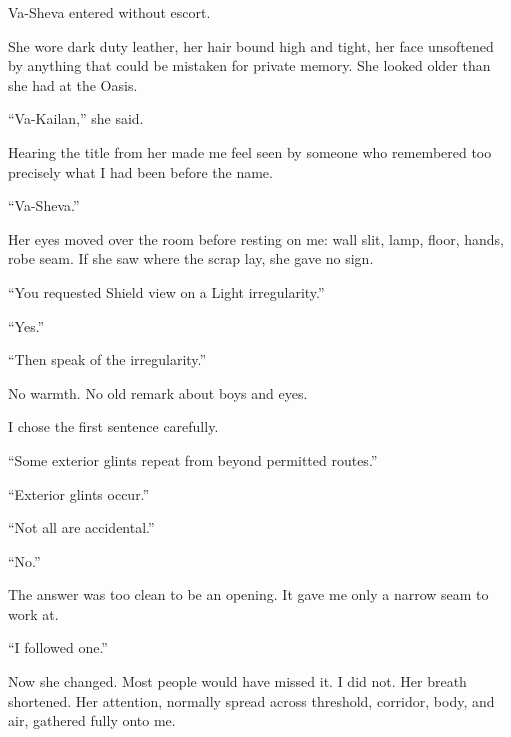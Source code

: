 Va-Sheva entered without escort.\par

She wore dark duty leather, her hair bound high and tight, her face unsoftened by anything that could be mistaken for private memory. She looked older than she had at the Oasis.\par

``Va-Kailan,'' she said.\par

Hearing the title from her made me feel seen by someone who remembered too precisely what I had been before the name.\par

``Va-Sheva.''\par

Her eyes moved over the room before resting on me: wall slit, lamp, floor, hands, robe seam. If she saw where the scrap lay, she gave no sign.\par

``You requested Shield view on a Light irregularity.''\par

``Yes.''\par

``Then speak of the irregularity.''\par

No warmth. No old remark about boys and eyes.\par

I chose the first sentence carefully.\par

``Some exterior glints repeat from beyond permitted routes.''\par

``Exterior glints occur.''\par

``Not all are accidental.''\par

``No.''\par

The answer was too clean to be an opening. It gave me only a narrow seam to work at.\par

``I followed one.''\par

Now she changed. Most people would have missed it. I did not. Her breath shortened. Her attention, normally spread across threshold, corridor, body, and air, gathered fully onto me.\par

